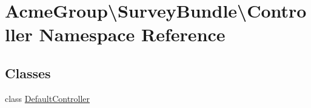 \hypertarget{namespace_acme_group_1_1_survey_bundle_1_1_controller}{\section{Acme\+Group\textbackslash{}Survey\+Bundle\textbackslash{}Controller Namespace Reference}
\label{namespace_acme_group_1_1_survey_bundle_1_1_controller}
}
\subsection*{Classes}
\begin{DoxyCompactItemize}
\item 
class \hyperlink{class_acme_group_1_1_survey_bundle_1_1_controller_1_1_default_controller}{Default\+Controller}
\end{DoxyCompactItemize}

